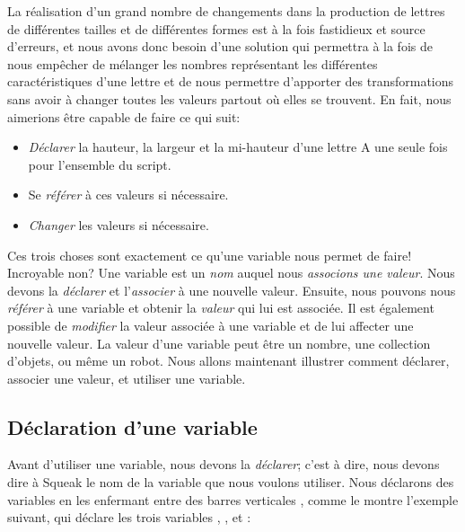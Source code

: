 \documentclass[a4paper,10pt,twoside]{book}
\begin{document}
La r\'ealisation  d'un grand nombre de changements dans la production de lettres de diff\'erentes tailles et de diff\'erentes formes est \`a la fois fastidieux et source d'erreurs, et nous avons donc besoin d'une solution qui permettra \`a la fois de nous emp\^echer  de m\'elanger les nombres repr\'esentant les diff\'erentes caract\'eristiques d'une lettre et de nous permettre d'apporter des transformations sans avoir \`a changer toutes les valeurs partout o\`u elles se trouvent. En fait, nous aimerions \^etre capable de faire ce qui suit: 

\begin{itemize}
	\item \emph{D\'eclarer}  la hauteur, la largeur et la mi-hauteur d'une lettre A une seule fois pour l'ensemble du script.
	\item Se \emph{r\'ef\'erer} \`a ces valeurs si n\'ecessaire. 
	\item \emph{Changer} les valeurs si n\'ecessaire. 
\end{itemize}

Ces trois choses sont exactement ce qu'une variable nous permet de faire! Incroyable non? Une variable est un \emph{nom} auquel nous \emph{associons une valeur}. Nous devons la \emph{d\'eclarer} et l'\emph{associer} \`a une nouvelle valeur. Ensuite, nous pouvons nous \emph{r\'ef\'erer} \`a une variable et obtenir la \emph{valeur} qui lui est associ\'ee. Il est \'egalement possible de \emph{modifier} la valeur associ\'ee \`a une variable et de lui affecter une nouvelle valeur. La valeur d'une variable peut \^etre un nombre, une collection d'objets, ou m\^eme un robot. Nous allons maintenant illustrer comment d\'eclarer, associer une valeur, et utiliser une variable. 


\subsection{D\'eclaration d'une variable } 

Avant d'utiliser une variable, nous devons la \emph{d\'eclarer}; c'est \`a dire, nous devons dire \`a Squeak le nom de la variable que nous voulons utiliser. Nous d\'eclarons des variables en les enfermant entre des barres verticales \ct{||}, comme le montre l'exemple suivant, qui d\'eclare les trois variables , , et :
\end{document}
